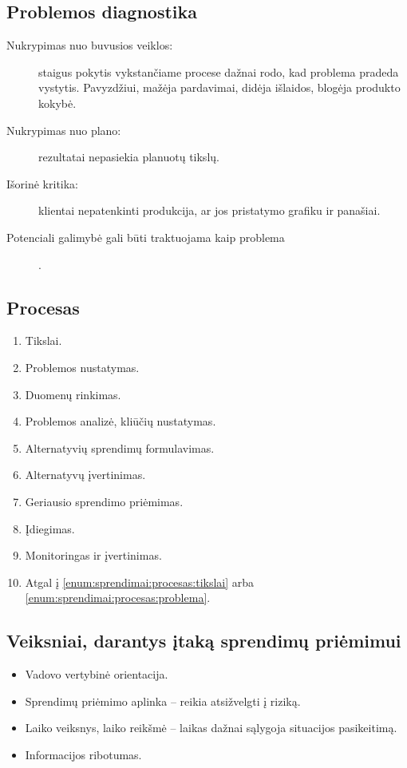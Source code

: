 \subsection{Problemos diagnostika}

\begin{description}
  \item[Nukrypimas nuo buvusios veiklos:] staigus pokytis
    vykstančiame procese dažnai rodo, kad problema pradeda vystytis.
    Pavyzdžiui, mažėja pardavimai, didėja išlaidos, blogėja produkto
    kokybė.
  \item[Nukrypimas nuo plano:] rezultatai nepasiekia planuotų
    tikslų.
  \item[Išorinė kritika:] klientai nepatenkinti produkcija, ar jos
    pristatymo grafiku ir panašiai.
  \item[Potenciali galimybė gali būti traktuojama kaip problema] .
\end{description}

\subsection{Procesas}

\begin{enumerate}
  \item \label{enum:sprendimai:procesas:tikslai} Tikslai.
  \item \label{enum:sprendimai:procesas:problema} Problemos nustatymas.
  \item Duomenų rinkimas.
  \item Problemos analizė, kliūčių nustatymas.
  \item Alternatyvių sprendimų formulavimas.
  \item Alternatyvų įvertinimas.
  \item Geriausio sprendimo priėmimas.
  \item Įdiegimas.
  \item Monitoringas ir įvertinimas.
  \item Atgal į \ref{enum:sprendimai:procesas:tikslai} arba
    \ref{enum:sprendimai:procesas:problema}.
\end{enumerate}

\subsection{Veiksniai, darantys įtaką sprendimų priėmimui}

\begin{itemize}
  \item Vadovo vertybinė orientacija.
  \item Sprendimų priėmimo aplinka – reikia atsižvelgti į riziką.
  \item Laiko veiksnys, laiko reikšmė – laikas dažnai sąlygoja situacijos
    pasikeitimą.
  \item Informacijos ribotumas.
\end{itemize}

